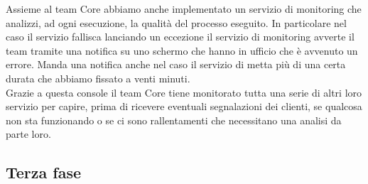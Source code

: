 \documentclass[a4paper, 12pt, twoside, openright]{book}
\begin{document}
Assieme al team Core abbiamo anche implementato un servizio di monitoring che analizzi, ad ogni esecuzione, la qualità del processo eseguito. In particolare nel caso il servizio fallisca lanciando un eccezione il servizio di monitoring avverte il team tramite una notifica su uno schermo che hanno in ufficio che è avvenuto un errore. Manda una notifica anche nel caso il servizio di metta più di una certa durata che abbiamo fissato a venti minuti.\\
Grazie a questa console il team Core tiene monitorato tutta una serie di altri loro servizio per capire, prima di ricevere eventuali segnalazioni dei clienti, se qualcosa non sta funzionando o se ci sono rallentamenti che necessitano una analisi da parte loro.\\

\subsection{Terza fase}
\end{document}
